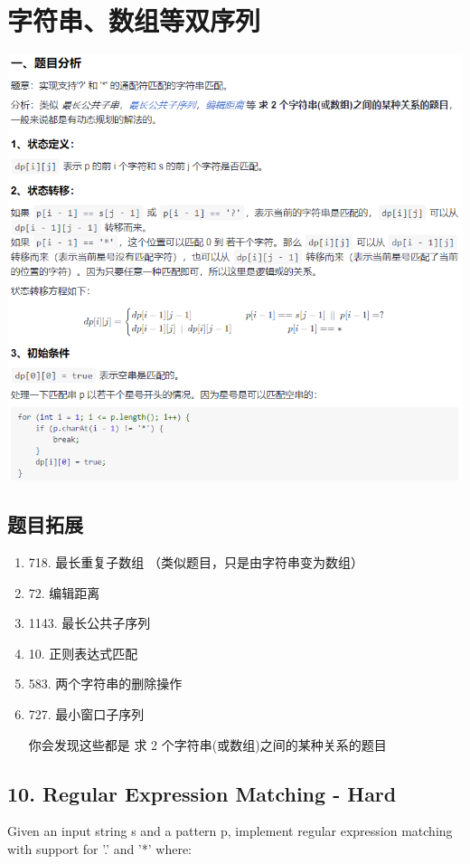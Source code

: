 \documentclass[9pt, b5paaper]{book}
\begin{document}
\section{字符串、数组等双序列}
\label{sec-1-2}

\includegraphics[width=.9\linewidth]{./pic/doubSeq.png}

\subsection{题目拓展}
\label{sec-1-2-1}
\begin{enumerate}
\item 718. 最长重复子数组 （类似题目，只是由字符串变为数组）
\label{sec-1-2-1-1}
\item 72. 编辑距离
\label{sec-1-2-1-2}
\item 1143. 最长公共子序列
\label{sec-1-2-1-3}
\item 10. 正则表达式匹配
\label{sec-1-2-1-4}
\item 583. 两个字符串的删除操作
\label{sec-1-2-1-5}
\item 727. 最小窗口子序列
\label{sec-1-2-1-6}

你会发现这些都是 求 2 个字符串(或数组)之间的某种关系的题目
\end{enumerate}
\subsection{10. Regular Expression Matching - Hard}
\label{sec-1-2-2}
Given an input string s and a pattern p, implement regular expression matching with support for '.' and '*' where:
\end{document}
